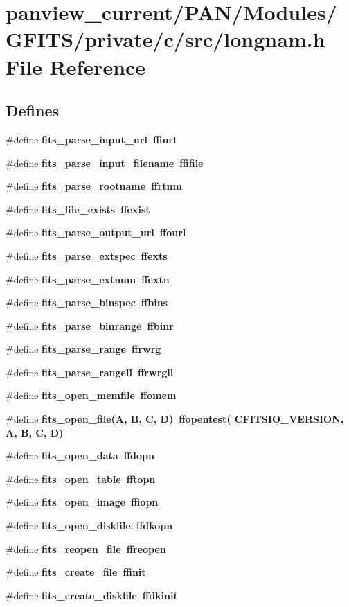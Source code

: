 \section{panview\_\-current/PAN/Modules/GFITS/private/c/src/longnam.h File Reference}
\label{longnam_8h}
\subsection*{Defines}
\begin{CompactItemize}
\item 
\#define \bf{fits\_\-parse\_\-input\_\-url}~ffiurl
\item 
\#define \bf{fits\_\-parse\_\-input\_\-filename}~ffifile
\item 
\#define \bf{fits\_\-parse\_\-rootname}~ffrtnm
\item 
\#define \bf{fits\_\-file\_\-exists}~ffexist
\item 
\#define \bf{fits\_\-parse\_\-output\_\-url}~ffourl
\item 
\#define \bf{fits\_\-parse\_\-extspec}~ffexts
\item 
\#define \bf{fits\_\-parse\_\-extnum}~ffextn
\item 
\#define \bf{fits\_\-parse\_\-binspec}~ffbins
\item 
\#define \bf{fits\_\-parse\_\-binrange}~ffbinr
\item 
\#define \bf{fits\_\-parse\_\-range}~ffrwrg
\item 
\#define \bf{fits\_\-parse\_\-rangell}~ffrwrgll
\item 
\#define \bf{fits\_\-open\_\-memfile}~ffomem
\item 
\#define \bf{fits\_\-open\_\-file}(A, B, C, D)~ffopentest( CFITSIO\_\-VERSION, A, B, C, D)
\item 
\#define \bf{fits\_\-open\_\-data}~ffdopn
\item 
\#define \bf{fits\_\-open\_\-table}~fftopn
\item 
\#define \bf{fits\_\-open\_\-image}~ffiopn
\item 
\#define \bf{fits\_\-open\_\-diskfile}~ffdkopn
\item 
\#define \bf{fits\_\-reopen\_\-file}~ffreopen
\item 
\#define \bf{fits\_\-create\_\-file}~ffinit
\item 
\#define \bf{fits\_\-create\_\-diskfile}~ffdkinit
\item 

\end{CompactItemize}
